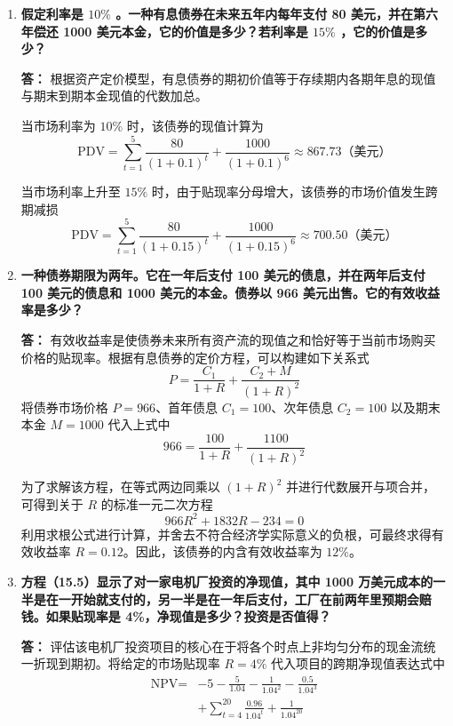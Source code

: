 \begin{enumerate}[label=\textbf{\arabic*.}, leftmargin=*]
		\item \textbf{假定利率是 $10\%$ 。一种有息债券在未来五年内每年支付 80 美元，并在第六年偿还 1000 美元本金，它的价值是多少？若利率是 $15\%$ ，它的价值是多少？}
		
		\textbf{答：}
		根据资产定价模型，有息债券的期初价值等于存续期内各期年息的现值与期末到期本金现值的代数加总。
		
		当市场利率为 $10\%$ 时，该债券的现值计算为
		\[
		\text{PDV} = \sum_{t=1}^5 \frac{80}{(1 + 0.1)^t} + \frac{1000}{(1 + 0.1)^6} \approx 867.73 \text{（美元）}
		\]
		
		当市场利率上升至 $15\%$ 时，由于贴现率分母增大，该债券的市场价值发生跨期减损
		\[
		\text{PDV} = \sum_{t=1}^5 \frac{80}{(1 + 0.15)^t} + \frac{1000}{(1 + 0.15)^6} \approx 700.50 \text{（美元）}
		\]
		\newpage
		
		\item \textbf{一种债券期限为两年。它在一年后支付 100 美元的债息，并在两年后支付 100 美元的债息和 1000 美元的本金。债券以 966 美元出售。它的有效收益率是多少？}
		
		\textbf{答：}
		有效收益率是使债券未来所有资产流的现值之和恰好等于当前市场购买价格的贴现率。根据有息债券的定价方程，可以构建如下关系式
		\[
		P = \frac{C_1}{1+R} + \frac{C_2 + M}{(1+R)^2}
		\]
		将债券市场价格 $P = 966$、首年债息 $C_1 = 100$、次年债息 $C_2 = 100$ 以及期末本金 $M = 1000$ 代入上式中
		\[
		966 = \frac{100}{1+R} + \frac{1100}{(1+R)^2}
		\]
		
		为了求解该方程，在等式两边同乘以 $(1+R)^2$ 并进行代数展开与项合并，可得到关于 $R$ 的标准一元二次方程
		\[
		966R^2 + 1832R - 234 = 0
		\]
		利用求根公式进行计算，并舍去不符合经济学实际意义的负根，可最终求得有效收益率 $R = 0.12$。因此，该债券的内含有效收益率为 $12\%$。
		
		\item \textbf{方程（15.5）显示了对一家电机厂投资的净现值，其中 1000 万美元成本的一半是在一开始就支付的，另一半是在一年后支付，工厂在前两年里预期会赔钱。如果贴现率是 4\%，净现值是多少？投资是否值得？}
		
		\textbf{答：}
		评估该电机厂投资项目的核心在于将各个时点上非均匀分布的现金流统一折现到期初。将给定的市场贴现率 $R = 4\%$ 代入项目的跨期净现值表达式中
		\[
		\begin{aligned}
			\text{NPV} = &-5 - \frac{5}{1.04} - \frac{1}{1.04^2} - \frac{0.5}{1.04^3} \\
			&+ \sum_{t=4}^{20} \frac{0.96}{1.04^t} + \frac{1}{1.04^{20}}
		\end{aligned}
		\]
		

\end{enumerate}
